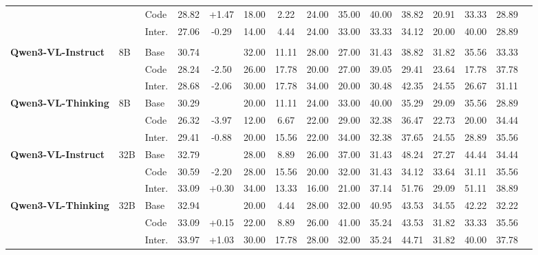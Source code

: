 \documentclass[runningheads]{llncs}
\begin{document}
\begin{table}[htbp]
{\begin{tabular}{lll c c cccccccccc}
     & & Code & \cellcolor{bgGain}28.82 & \cellcolor{bgGain}+1.47 & 18.00 & 2.22 & 24.00 & 35.00 & 40.00 & 38.82 & 20.91 & 33.33 & 28.89 \\
     & & Inter. & \cellcolor{bgLoss}27.06 & \cellcolor{bgLoss}-0.29 & 14.00 & 4.44 & 24.00 & 33.00 & 33.33 & 34.12 & 20.00 & 40.00 & 28.89 \\
    \addlinespace
    \midrule
    \rowcolor{gray!15}\multicolumn{14}{c}{\textbf{Category 4: Open-source General-purpose Models}} \\
    \midrule
    \textbf{Qwen3-VL-Instruct} & 8B & Base & 30.74 & & 32.00 & 11.11 & 28.00 & 27.00 & 31.43 & 38.82 & 31.82 & 35.56 & 33.33 \\
     & & Code & \cellcolor{bgLoss}28.24 & \cellcolor{bgLoss}-2.50 & 26.00 & 17.78 & 20.00 & 27.00 & 39.05 & 29.41 & 23.64 & 17.78 & 37.78 \\
     & & Inter. & \cellcolor{bgLoss}28.68 & \cellcolor{bgLoss}-2.06 & 30.00 & 17.78 & 34.00 & 20.00 & 30.48 & 42.35 & 24.55 & 26.67 & 31.11 \\
    \addlinespace
    \textbf{Qwen3-VL-Thinking} & 8B & Base & 30.29 & & 20.00 & 11.11 & 24.00 & 33.00 & 40.00 & 35.29 & 29.09 & 35.56 & 28.89 \\
    &  & Code & \cellcolor{bgLoss}26.32 & \cellcolor{bgLoss}-3.97 & 12.00 & 6.67 & 22.00 & 29.00 & 32.38 & 36.47 & 22.73 & 20.00 & 34.44 \\
    &  & Inter. & \cellcolor{bgLoss}29.41 & \cellcolor{bgLoss}-0.88 & 20.00 & 15.56 & 22.00 & 34.00 & 32.38 & 37.65 & 24.55 & 28.89 & 35.56 \\
    \addlinespace
    \textbf{Qwen3-VL-Instruct} & 32B & Base & 32.79 & & 28.00 & 8.89 & 26.00 & 37.00 & 31.43 & 48.24 & 27.27 & 44.44 & 34.44 \\
     & & Code & \cellcolor{bgLoss}30.59 & \cellcolor{bgLoss}-2.20 & 28.00 & 15.56 & 20.00 & 32.00 & 31.43 & 34.12 & 33.64 & 31.11 & 35.56 \\
     & & Inter. & \cellcolor{bgGain}33.09 & \cellcolor{bgGain}+0.30 & 34.00 & 13.33 & 16.00 & 21.00 & 37.14 & 51.76 & 29.09 & 51.11 & 38.89 \\
    \addlinespace
    \textbf{Qwen3-VL-Thinking} & 32B & Base & 32.94 & & 20.00 & 4.44 & 28.00 & 32.00 & 40.95 & 43.53 & 34.55 & 42.22 & 32.22 \\
     & & Code & \cellcolor{bgGain}33.09 & \cellcolor{bgGain}+0.15 & 22.00 & 8.89 & 26.00 & 41.00 & 35.24 & 43.53 & 31.82 & 33.33 & 35.56 \\
     & & Inter. & \cellcolor{bgGain}33.97 & \cellcolor{bgGain}+1.03 & 30.00 & \cellcolor{yellow!40}17.78 & 28.00 & 32.00 & 35.24 & 44.71 & 31.82 & 40.00 & 37.78 \\

\end{tabular}}
\end{table}
\end{document}

